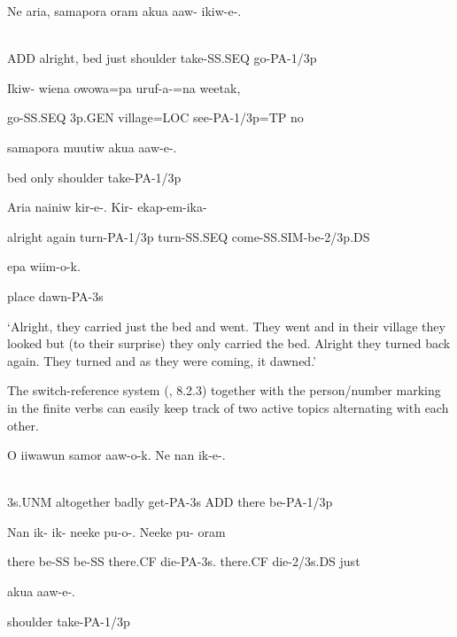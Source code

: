 \ea%
\label{ex:x1675}
\gll Ne  aria,  samapora  oram  akua  aaw-  ikiw-e-. \\
      \\
\glt
\z

ADD  alright,  bed  just  shoulder  take-SS.SEQ  go-PA-1/3p

Ikiw-  wiena  owowa=pa  uruf-a-=na  weetak,

go-SS.SEQ  3p.GEN  village=LOC  see-PA-1/3p=TP  no

samapora  muutiw  akua  aaw-e-.

bed  only  shoulder  take-PA-1/3p

Aria  nainiw  kir-e-.  Kir-  ekap-em-ika-

alright  again  turn-PA-1/3p  turn-SS.SEQ  come-SS.SIM-be-2/3p.DS

epa  wiim-o-k.

place  dawn-PA-3s

`Alright, they carried just the bed and went. They went and in their village they looked but (to their surprise) they only carried the bed. Alright they turned back again. They turned and as they were coming, it dawned.'

The switch-reference system (, 8.2.3) together with the person/number marking in the finite verbs can easily keep track of two active topics alternating with each other. 

\ea%
\label{ex:x1676}
\gll O  iiwawun  samor  aaw-o-k.  Ne  nan  ik-e-.  \\
      \\
\glt
\z

3s.UNM  altogether  badly  get-PA-3s  ADD  there  be-PA-1/3p

Nan  ik-  ik-  neeke  pu-o-.  Neeke  pu-  oram

there  be-SS  be-SS  there.CF  die-PA-3s.  there.CF  die-2/3s.DS  just

akua  aaw-e-.

shoulder  take-PA-1/3p

